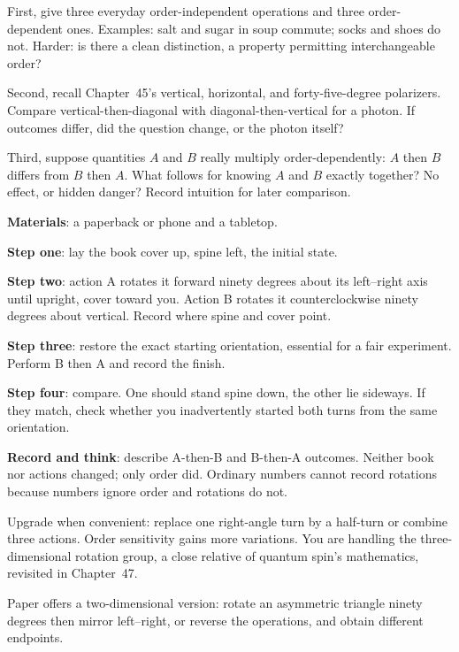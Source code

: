 First, give three everyday order-independent operations and three order-dependent ones. Examples: salt and sugar in soup commute; socks and shoes do not. Harder: is there a clean distinction, a property permitting interchangeable order?

Second, recall Chapter~45's vertical, horizontal, and forty-five-degree polarizers. Compare vertical-then-diagonal with diagonal-then-vertical for a photon. If outcomes differ, did the question change, or the photon itself?

Third, suppose quantities $A$ and $B$ really multiply order-dependently: $A$ then $B$ differs from $B$ then $A$. What follows for knowing $A$ and $B$ exactly together? No effect, or hidden danger? Record intuition for later comparison.


\begin{experiment}
\textbf{Materials}: a paperback or phone and a tabletop.

\textbf{Step one}: lay the book cover up, spine left, the initial state.

\textbf{Step two}: action A rotates it forward ninety degrees about its left--right axis until upright, cover toward you. Action B rotates it counterclockwise ninety degrees about vertical. Record where spine and cover point.

\textbf{Step three}: restore the exact starting orientation, essential for a fair experiment. Perform B then A and record the finish.

\textbf{Step four}: compare. One should stand spine down, the other lie sideways. If they match, check whether you inadvertently started both turns from the same orientation.

\textbf{Record and think}: describe A-then-B and B-then-A outcomes. Neither book nor actions changed; only order did. Ordinary numbers cannot record rotations because numbers ignore order and rotations do not.
\end{experiment}

Upgrade when convenient: replace one right-angle turn by a half-turn or combine three actions. Order sensitivity gains more variations. You are handling the three-dimensional rotation group, a close relative of quantum spin's mathematics, revisited in Chapter~47.

Paper offers a two-dimensional version: rotate an asymmetric triangle ninety degrees then mirror left--right, or reverse the operations, and obtain different endpoints.

